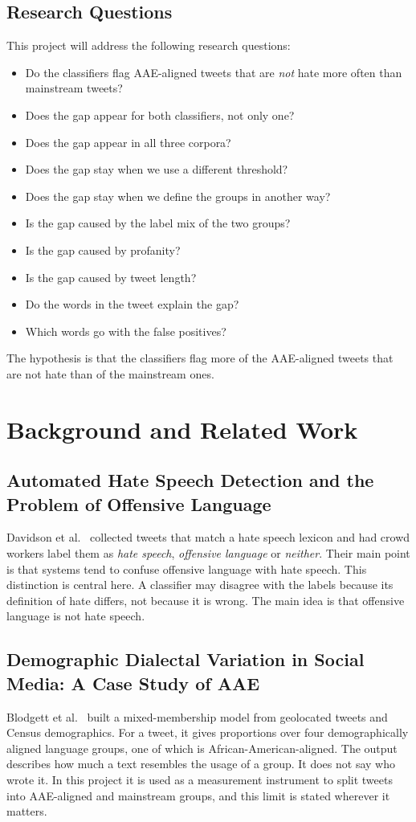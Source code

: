 \documentclass[runningheads,a4paper,oribibl]{llncs}
\begin{document}
\subsection{Research Questions}
This project will address the following research questions:
\begin{itemize}
  \item Do the classifiers flag AAE-aligned tweets that are \emph{not} hate more often than mainstream tweets?
  \item Does the gap appear for both classifiers, not only one?
  \item Does the gap appear in all three corpora?
  \item Does the gap stay when we use a different threshold?
  \item Does the gap stay when we define the groups in another way?
  \item Is the gap caused by the label mix of the two groups?
  \item Is the gap caused by profanity?
  \item Is the gap caused by tweet length?
  \item Do the words in the tweet explain the gap?
  \item Which words go with the false positives?
\end{itemize}
The hypothesis is that the classifiers flag more of the AAE-aligned tweets that are not hate
than of the mainstream ones.

\section{Background and Related Work}

\subsection{Automated Hate Speech Detection and the Problem of Offensive Language}
Davidson et al.~\cite{davidson2017} collected tweets that match a hate speech lexicon and had
crowd workers label them as \emph{hate speech}, \emph{offensive language} or \emph{neither}.
Their main point is that systems tend to confuse offensive language with hate speech. This
distinction is central here. A classifier may disagree with the labels because its definition
of hate differs, not because it is wrong. The main idea is that offensive language is not hate speech.

\subsection{Demographic Dialectal Variation in Social Media: A Case Study of AAE}
Blodgett et al.~\cite{blodgett2016} built a mixed-membership model from geolocated tweets and
Census demographics. For a tweet, it gives proportions over four demographically aligned language
groups, one of which is African-American-aligned. The output describes how much a text resembles
the usage of a group. It does not say who wrote it. In this project it is used as a measurement
instrument to split tweets into AAE-aligned and mainstream groups, and this limit is stated wherever it matters.
\end{document}
